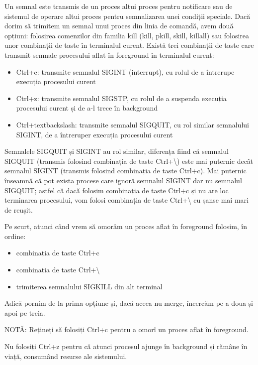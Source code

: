 Un semnal este transmis de un proces altui proces pentru notificare sau de
sistemul de operare altui proces pentru semnalizarea unei condiții speciale.
Dacă dorim să trimitem un semnal unui proces din linia de comandă, avem două
opțiuni: folosirea comenzilor din familia kill (kill, pkill, skill, killall) sau
folosirea unor combinații de taste în terminalul curent. Există trei combinații
de taste care transmit semnale procesului aflat în foreground în terminalul
curent:

\begin{itemize}
	\item Ctrl+c: transmite semnalul SIGINT (interrupt), cu rolul de a
		întrerupe execuția procesului curent
	\item Ctrl+z: transmite semnalul SIGSTP, cu rolul de a suspenda execuția
		procesului curent și de a-l trece în background
	\item Ctrl+textbackslash{}: transmite semnalul SIGQUIT, cu rol similar
		semnalului SIGINT, de a întreruper execuția procesului curent
\end{itemize}

Semnalele SIGQUIT și SIGINT au rol similar, diferența fiind că semnalul SIGQUIT
(transmis folosind combinația de taste Ctrl+\textbackslash{}) este mai puternic
decât semnalul SIGINT (transmis folosind combinația de taste Ctrl+c). Mai
puternic înseamnă că pot exista procese care ignoră semnalul SIGINT dar nu
semnalul SIGQUIT; astfel că dacă folosim combinația de taste Ctrl+c și nu are
loc terminarea procesului, vom folosi combinația de taste Ctrl+\textbackslash{}
cu șanse mai mari de reușit.

Pe scurt, atunci când vrem să omorâm un proces aflat în foreground folosim, în
ordine:

\begin{itemize}
	\item combinația de taste Ctrl+c
	\item combinația de taste Ctrl+\textbackslash{}
	\item trimiterea semnalului SIGKILL din alt terminal
\end{itemize}

Adică pornim de la prima opțiune și, dacă aceea nu merge, încercăm pe a doua și
apoi pe treia.

NOTĂ: Rețineți să folosiți Ctrl+c pentru a omorî un proces aflat în foreground.

Nu folosiți Ctrl+z pentru că atunci procesul ajunge în background și rămâne în
viață, consumând resurse ale sistemului.

